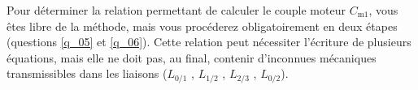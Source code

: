  

\ifprof
\else
Pour déterminer la relation permettant de calculer le couple moteur $C_{\text{m1}}$, vous êtes libre de la méthode,
mais vous procéderez obligatoirement en deux étapes (questions \ref{q_05} et \ref{q_06}). Cette relation peut nécessiter
l’écriture de plusieurs équations, mais elle ne doit pas, au final, contenir d’inconnues mécaniques
transmissibles dans les liaisons ($L_{\text{0/1}}$ , $L_{\text{1/2}}$ , $L_{\text{2/3}}$ , $L_{\text{0/2}}$).
\fi

